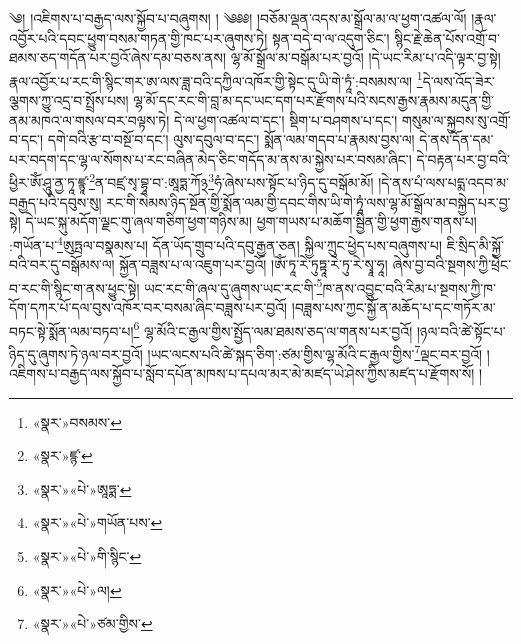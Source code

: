 ༄། །འཇིགས་པ་བརྒྱད་ལས་སྐྱོབ་པ་བཞུགས། ། ༄༅༅། །བཅོམ་ལྡན་འདས་མ་སྒྲོལ་མ་ལ་ཕྱག་འཚལ་ལོ། །རྣལ་འབྱོར་པའི་དབང་ཕྱུག་བསམ་གཏན་གྱི་ཁང་པར་ཞུགས་ཏེ། སྟན་བདེ་བ་ལ་འདུག་ཅིང་། སྙིང་རྗེ་ཆེན་པོས་འགྲོ་བ་ཐམས་ཅད་གདོན་པར་བྱའོ་ཞེས་དམ་བཅས་ནས། ལྷ་མོ་སྒྲོལ་མ་བསྒོམ་པར་བྱའོ། །དེ་ཡང་རིམ་པ་འདི་ལྟར་བྱ་སྟེ། རྣལ་འབྱོར་པ་རང་གི་སྙིང་གར་ཨ་ལས་ཟླ་བའི་དཀྱིལ་འཁོར་གྱི་སྟེང་དུ་ཡི་གེ་ཏཱཾ་:བསམས་ལ། \footnote{«སྣར་»བསམས་}དེ་ལས་འོད་ཟེར་ལྕགས་ཀྱུ་འདྲ་བ་སྤྲོས་པས། ལྷ་མོ་དང་རང་གི་བླ་མ་དང་ཡང་དག་པར་རྫོགས་པའི་སངས་རྒྱས་རྣམས་མདུན་གྱི་ནམ་མཁའ་ལ་གསལ་བར་བལྟས་ཏེ། དེ་ལ་ཕྱག་འཚལ་བ་དང་། སྡིག་པ་བཤགས་པ་དང་། གསུམ་ལ་སྐྱབས་སུ་འགྲོ་བ་དང་། དགེ་བའི་རྩ་བ་བསྔོ་བ་དང་། ལུས་དབུལ་བ་དང་། སྨོན་ལམ་གདབ་པ་རྣམས་བྱས་ལ། དེ་ནས་དོན་དམ་པར་བདག་དང་ལྷ་ལ་སོགས་པ་རང་བཞིན་མེད་ཅིང་གདོད་མ་ནས་མ་སྐྱེས་པར་བསམ་ཞིང་། དེ་བརྟན་པར་བྱ་བའི་ཕྱིར་ཨོཾ་ཤཱུ་ནྱ་ཏཱ་ཛྙཱ་\footnote{«སྣར་»ཛྙ་}ན་བཛྲ་སྭ་བྷཱ་བ་:ཨཱཏྨ་ཀོ྅\footnote{«སྣར་»«པེ་»ཨཱཏྨ་}ཧཾ་ཞེས་པས་སྟོང་པ་ཉིད་དུ་བསྒོམ་མོ། །དེ་ནས་པཾ་ལས་པདྨ་འདབ་མ་བརྒྱད་པའི་དབུས་སུ། རང་གི་སེམས་ཉིད་སྔོན་གྱི་སྨོན་ལམ་གྱི་དབང་གིས་ཡི་གེ་ཏཱཾ་ལས་ལྷ་མོ་སྒྲོལ་མ་བསྐྱེད་པར་བྱ་སྟེ། དེ་ཡང་སྐུ་མདོག་ལྗང་གུ་ཞལ་གཅིག་ཕྱག་གཉིས་མ། ཕྱག་གཡས་པ་མཆོག་སྦྱིན་གྱི་ཕྱག་རྒྱས་གནས་པ། :གཡོན་པ་\footnote{«སྣར་»«པེ་»གཡོན་པས་}ཨུཏྤལ་བསྣམས་པ། དོན་ཡོད་གྲུབ་པའི་དབུ་རྒྱན་ཅན། སྐྱིལ་ཀྲུང་ཕྱེད་པས་བཞུགས་པ། ཇི་སྲིད་མི་སྐྱོ་བའི་བར་དུ་བསྒོམས་ལ། སྐྱོན་བཟླས་པ་ལ་འཇུག་པར་བྱའོ། །ཨོཾ་ཏཱ་རེ་ཏུཏྟཱ་རེ་ཏུ་རེ་སྭཱ་ཧཱ། ཞེས་བྱ་བའི་སྔགས་ཀྱི་ཕྲེང་བ་རང་གི་སྙིང་ག་ནས་ཕྱུང་སྟེ། ཡང་རང་གི་ཞལ་དུ་ཞུགས་ཡང་རང་གི་\footnote{«སྣར་»«པེ་»གི་སྙིང་}ཁ་ནས་འབྱུང་བའི་རིམ་པ་སྔགས་ཀྱི་ཁ་དོག་དཀར་པོ་དལ་བུས་འཁོར་བར་བསམ་ཞིང་བཟླས་པར་བྱའོ། །བཟླས་པས་ཀྱང་སྐྱོ་ན་མཆོད་པ་དང་གཏོར་མ་བཏང་སྟེ་སྨོན་ལམ་བཏབ་པ།\footnote{«སྣར་»«པེ་»ལ།} ལྷ་མོའི་ང་རྒྱལ་གྱིས་སྤྱོད་ལམ་ཐམས་ཅད་ལ་གནས་པར་བྱའོ། །ཉལ་བའི་ཚེ་སྟོང་པ་ཉིད་དུ་ཞུགས་ཏེ་ཉལ་བར་བྱའོ། །ཡང་ལངས་པའི་ཚེ་སྐད་ཅིག་:ཙམ་གྱིས་ལྷ་མོའི་ང་རྒྱལ་གྱིས་\footnote{«སྣར་»«པེ་»ཙམ་གྱིས་}ལྡང་བར་བྱའོ། །འཇིགས་པ་བརྒྱད་ལས་སྐྱོབ་པ་སློབ་དཔོན་མཁས་པ་དཔལ་མར་མེ་མཛད་ཡེ་ཤེས་ཀྱིས་མཛད་པ་རྫོགས་སོ། ། 